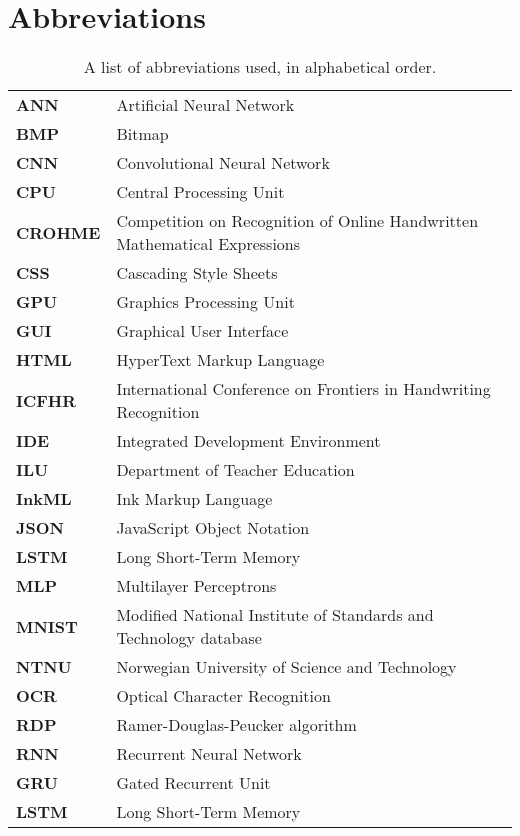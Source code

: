 \section{Abbreviations}  %
\begin{table}[H]
\begin{tabular}{ l l }
\textbf{ANN} & Artificial Neural Network \\
\textbf{BMP} & Bitmap \\
\textbf{CNN} & Convolutional Neural Network \\
\textbf{CPU} & Central Processing Unit \\
\textbf{CROHME} & Competition on Recognition of Online Handwritten Mathematical Expressions\\
\textbf{CSS} & Cascading Style Sheets \\
\textbf{GPU} & Graphics Processing Unit \\
\textbf{GUI} & Graphical User Interface \\
\textbf{HTML} & HyperText Markup Language \\ 
\textbf{ICFHR} & International Conference on Frontiers in Handwriting Recognition \\
\textbf{IDE} & Integrated Development Environment \\
\textbf{ILU} & Department of Teacher Education \\
\textbf{InkML} & Ink Markup Language \\
\textbf{JSON} & JavaScript Object Notation \\
\textbf{LSTM} & Long Short-Term Memory \\
\textbf{MLP} & Multilayer Perceptrons \\
\textbf{MNIST} & Modified National Institute of Standards and Technology database \\
\textbf{NTNU} & Norwegian University of Science and Technology \\
\textbf{OCR} & Optical Character Recognition \\
\textbf{RDP} & Ramer-Douglas-Peucker algorithm \\
\textbf{RNN} & Recurrent Neural Network \\
\textbf{GRU} & Gated Recurrent Unit \\
\textbf{LSTM} & Long Short-Term Memory \\

\end{tabular}
\label{table:abbreviations}
\caption{A list of abbreviations used, in alphabetical order.}
\end{table}
